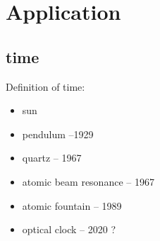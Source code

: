 \section{Application}

\subsection{time}
Definition of time:
\begin{itemize}
    \item sun
    \item pendulum --1929
    \item quartz -- 1967
    \item atomic beam resonance -- 1967
    \item atomic fountain -- 1989
    \item optical clock -- 2020 ?
\end{itemize}
